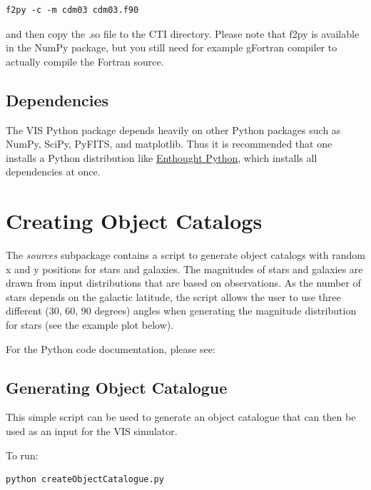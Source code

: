 \documentclass[a4paper,12pt,english]{sphinxmanual}
\begin{document}
\begin{Verbatim}[commandchars=\\\{\}]
f2py -c -m cdm03 cdm03.f90
\end{Verbatim}

and then copy the .so file to the CTI directory. Please note that f2py is available in the NumPy package,
but you still need for example gFortran compiler to actually compile the Fortran source.


\section{Dependencies}
\label{index:dependencies}
The VIS Python package depends heavily on other Python packages such as NumPy, SciPy, PyFITS, and matplotlib.
Thus it is recommended that one installs a Python distribution like \href{http://www.enthought.com/}{Enthought Python},
which installs all dependencies at once.


\chapter{Creating Object Catalogs}
\label{index:creating-object-catalogs}
The \emph{sources} subpackage contains a script to generate object catalogs with random x and y positions for
stars and galaxies. The magnitudes of stars and galaxies are drawn from input distributions that are
based on observations. As the number of stars depends on the galactic latitude, the script allows
the user to use three different (30, 60, 90 degrees) angles when generating the magnitude distribution for stars
(see the example plot below).

For the Python code documentation, please see:
\label{sources:module-sources.createObjectCatalogue}

\section{Generating Object Catalogue}
\label{sources::doc}\label{sources:generating-object-catalogue}
This simple script can be used to generate an object catalogue that can then be used
as an input for the VIS simulator.

To run:

\begin{Verbatim}[commandchars=\\\{\}]
python createObjectCatalogue.py
\end{Verbatim}
\end{document}
